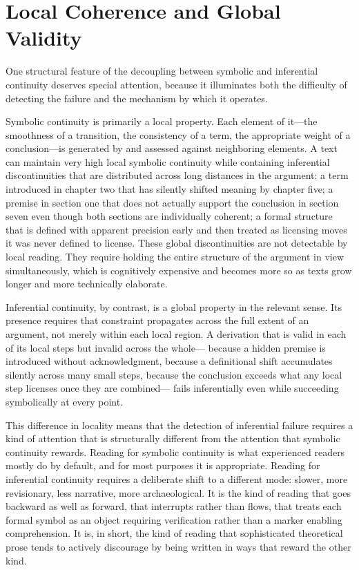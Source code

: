 \documentclass[12pt, openright, twoside]{book}
\begin{document}
\section{Local Coherence and Global Validity}

One structural feature of the decoupling between symbolic and inferential
continuity deserves special attention, because it illuminates both the difficulty
of detecting the failure and the mechanism by which it operates.

Symbolic continuity is primarily a local property. Each element of it---the
smoothness of a transition, the consistency of a term, the appropriate weight
of a conclusion---is generated by and assessed against neighboring elements.
A text can maintain very high local symbolic continuity while containing
inferential discontinuities that are distributed across long distances in
the argument: a term introduced in chapter two that has silently shifted
meaning by chapter five; a premise in section one that does not actually support
the conclusion in section seven even though both sections are individually
coherent; a formal structure that is defined with apparent precision early
and then treated as licensing moves it was never defined to license. These
global discontinuities are not detectable by local reading. They require
holding the entire structure of the argument in view simultaneously, which
is cognitively expensive and becomes more so as texts grow longer and more
technically elaborate.

Inferential continuity, by contrast, is a global property in the relevant
sense. Its presence requires that constraint propagates across the full
extent of an argument, not merely within each local region. A derivation
that is valid in each of its local steps but invalid across the whole---
because a hidden premise is introduced without acknowledgment, because a
definitional shift accumulates silently across many small steps, because
the conclusion exceeds what any local step licenses once they are combined---
fails inferentially even while succeeding symbolically at every point.

This difference in locality means that the detection of inferential failure
requires a kind of attention that is structurally different from the attention
that symbolic continuity rewards. Reading for symbolic continuity is what
experienced readers mostly do by default, and for most purposes it is
appropriate. Reading for inferential continuity requires a deliberate shift
to a different mode: slower, more revisionary, less narrative, more
archaeological. It is the kind of reading that goes backward as well as
forward, that interrupts rather than flows, that treats each formal symbol
as an object requiring verification rather than a marker enabling comprehension.
It is, in short, the kind of reading that sophisticated theoretical prose
tends to actively discourage by being written in ways that reward the other
kind.
\end{document}
